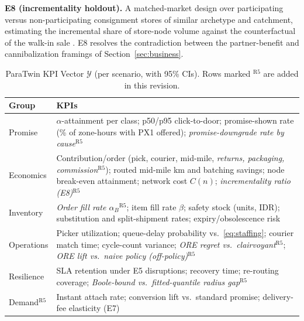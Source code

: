 \textbf{E8 (incrementality holdout).} A matched-market design over participating versus non-participating consignment stores of similar archetype and catchment, estimating the incremental share of store-node volume against the counterfactual of the walk-in sale \cite{imbens2015,abadie2010}. E8 resolves the contradiction between the partner-benefit and cannibalization framings of Section~\ref{sec:business}.

\begin{table}[t]
\caption{ParaTwin KPI Vector $\mathcal{Y}$ (per scenario, with 95\% CIs). Rows marked $^{\mathrm{R5}}$ are added in this revision.}
\label{tab:kpi}
\centering\footnotesize
\begin{tabular}{@{}p{1.3cm}p{6.3cm}@{}}
\toprule
\textbf{Group} & \textbf{KPIs}\\
\midrule
Promise & $\alpha$-attainment per class; p50/p95 click-to-door; promise-shown rate (\% of zone-hours with PX1 offered); \emph{promise-downgrade rate by cause}$^{\mathrm{R5}}$\\
Economics & Contribution/order (pick, courier, mid-mile, \emph{returns, packaging, commission}$^{\mathrm{R5}}$); routed mid-mile km and batching savings; node break-even attainment; network cost $C(n)$; \emph{incrementality ratio (E8)}$^{\mathrm{R5}}$\\
Inventory & \emph{Order fill rate $\alpha_B$}$^{\mathrm{R5}}$; item fill rate $\beta$; safety stock (units, IDR); substitution and split-shipment rates; expiry/obsolescence risk\\
Operations & Picker utilization; queue-delay probability vs.\ \eqref{eq:staffing}; courier match time; cycle-count variance; \emph{ORE regret vs.\ clairvoyant}$^{\mathrm{R5}}$; \emph{ORE lift vs.\ naive policy (off-policy)}$^{\mathrm{R5}}$\\
Resilience & SLA retention under E5 disruptions; recovery time; re-routing coverage; \emph{Boole-bound vs.\ fitted-quantile radius gap}$^{\mathrm{R5}}$\\
Demand$^{\mathrm{R5}}$ & Instant attach rate; conversion lift vs.\ standard promise; delivery-fee elasticity (E7)\\
\bottomrule
\end{tabular}
\end{table}
